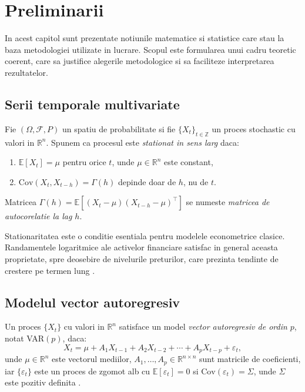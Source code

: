 \chapter{Preliminarii}

In acest capitol sunt prezentate notiunile matematice si statistice care stau la
baza metodologiei utilizate in lucrare. Scopul este formularea unui cadru teoretic
coerent, care sa justifice alegerile metodologice si sa faciliteze interpretarea
rezultatelor.

\section{Serii temporale multivariate}

Fie $(\Omega, \mathcal{F}, P)$ un spatiu de probabilitate si fie
$\{X_t\}_{t \in \mathbb{Z}}$ un proces stochastic cu valori in $\mathbb{R}^n$.
Spunem ca procesul este \textit{stationat in sens larg} daca:
\begin{enumerate}
    \item $\mathbb{E}[X_t] = \mu$ pentru orice $t$, unde $\mu \in \mathbb{R}^n$
    este constant,
    \item $\mathrm{Cov}(X_t, X_{t-h}) = \Gamma(h)$ depinde doar de $h$, nu de $t$.
\end{enumerate}
Matricea $\Gamma(h) = \mathbb{E}[(X_t - \mu)(X_{t-h} - \mu)^\top]$ se numeste
\textit{matricea de autocorelatie la lag $h$}.

Stationaritatea este o conditie esentiala pentru modelele econometrice clasice.
Randamentele logaritmice ale activelor financiare satisfac in general aceasta
proprietate, spre deosebire de nivelurile preturilor, care prezinta tendinte
de crestere pe termen lung \citep{tsay2010}.

\section{Modelul vector autoregresiv}

\begin{definition}
Un proces $\{X_t\}$ cu valori in $\mathbb{R}^n$ satisface un model
\textit{vector autoregresiv de ordin $p$}, notat VAR$(p)$, daca:
\begin{equation}
    X_t = \mu + A_1 X_{t-1} + A_2 X_{t-2} + \cdots + A_p X_{t-p} + \varepsilon_t,
    \label{eq:var}
\end{equation}
unde $\mu \in \mathbb{R}^n$ este vectorul mediilor, $A_1, \ldots, A_p \in \mathbb{R}^{n \times n}$
sunt matricile de coeficienti, iar $\{\varepsilon_t\}$ este un proces de zgomot alb
cu $\mathbb{E}[\varepsilon_t] = 0$ si $\mathrm{Cov}(\varepsilon_t) = \Sigma$,
unde $\Sigma$ este pozitiv definita \citep{lutkepohl2005}.
\end{definition}

